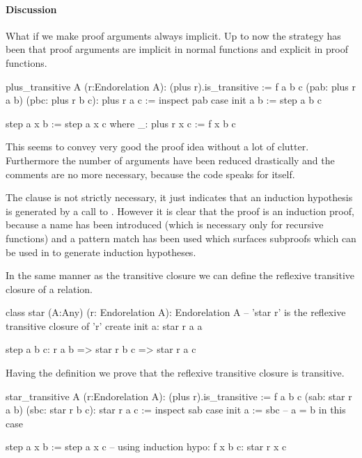\paragraph{Discussion} What if we make proof arguments always implicit. Up to
now the strategy has been that proof arguments are implicit in normal
functions and explicit in proof functions.

\begin{alba}
  plus_transitive A (r:Endorelation A): (plus r).is_transitive :=
    f a b c (pab: plus r a b) (pbc: plus r b c): plus r a c :=
      inspect
        pab
      case
        init a b :=
          step a b c

        step a x b :=
          step a x c
            where
              _: plus r x c :=  f x b c
\end{alba}
%
This seems to convey very good the proof idea without a lot of
clutter. Furthermore the number of arguments have been reduced drastically and
the comments are no more necessary, because the code speaks for itself.

The  clause is not strictly necessary, it just indicates that an
induction hypothesis is generated by a call to . However it is clear
that the proof is an induction proof, because a name  has been
introduced (which is necessary only for recursive functions) and a pattern
match has been used which surfaces subproofs which can be used in  to
generate induction hypotheses.



In the same manner as the transitive closure we can define the reflexive
transitive closure of a relation.

\begin{alba}
  class
    star (A:Any) (r: Endorelation A): Endorelation A
      -- 'star r' is the reflexive transitive closure of 'r'
  create
    init a:
      star r a a

    step a b c:
      r a b
      => star r b c
      => star r a c
\end{alba}

Having the definition we prove that the reflexive transitive closure is
transitive.

\begin{alba}
  star_transitive A (r:Endorelation A): (plus r).is_transitive :=
    f a b c (sab: star r a b) (sbc: star r b c): star r a c :=
      inspect
        sab
      case
        init a :=
          sbc
            -- a = b in this case

        step a x b :=
          step a x c
            -- using induction hypo: f x b c: star r x c
\end{alba}


